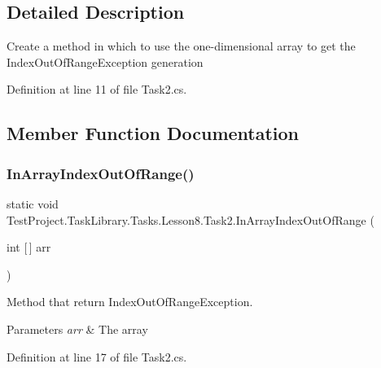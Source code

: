 \subsection{Detailed Description}
Create a method in which to use the one-\/dimensional array to get the Index\+Out\+Of\+Range\+Exception generation 



Definition at line 11 of file Task2.\+cs.



\subsection{Member Function Documentation}
\mbox{\label{class_test_project_1_1_task_library_1_1_tasks_1_1_lesson8_1_1_task2_aa9ba53ce2b0496ad1d44d98ffe28b137}} 
\subsubsection{\texorpdfstring{InArrayIndexOutOfRange()}{InArrayIndexOutOfRange()}}
{\footnotesize\ttfamily static void Test\+Project.\+Task\+Library.\+Tasks.\+Lesson8.\+Task2.\+In\+Array\+Index\+Out\+Of\+Range (\begin{DoxyParamCaption}\item[{int \mbox{[}$\,$\mbox{]}}]{arr }\end{DoxyParamCaption})\hspace{0.3cm}{\ttfamily [static]}}



Method that return Index\+Out\+Of\+Range\+Exception. 


\begin{DoxyParams}{Parameters}
{\em arr} & The array\\
\hline
\end{DoxyParams}


Definition at line 17 of file Task2.\+cs.

\mbox{\label{class_test_project_1_1_task_library_1_1_tasks_1_1_lesson8_1_1_task2_afb8ae5e5dd2f9e12b9e47e428e67775a}} 
